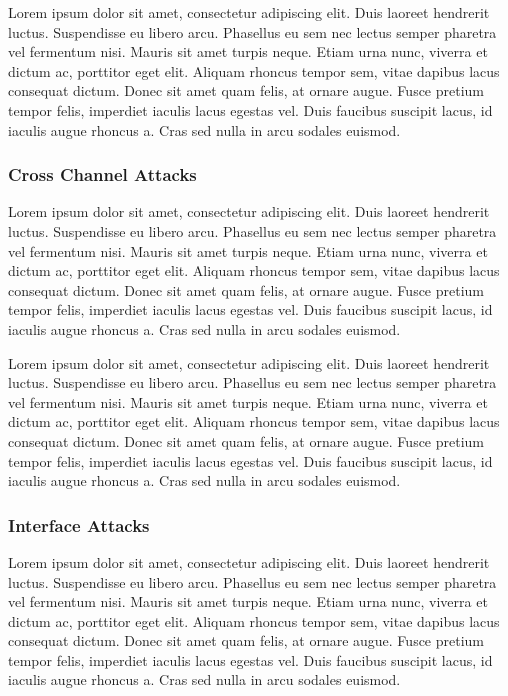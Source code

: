 \documentclass[final,conference,11pt]{IEEEtran}
\begin{document}
Lorem ipsum dolor sit amet, consectetur adipiscing elit. Duis laoreet hendrerit luctus. Suspendisse eu libero arcu. Phasellus eu sem nec lectus semper pharetra vel fermentum nisi. Mauris sit amet turpis neque. Etiam urna nunc, viverra et dictum ac, porttitor eget elit. Aliquam rhoncus tempor sem, vitae dapibus lacus consequat dictum. Donec sit amet quam felis, at ornare augue. Fusce pretium tempor felis, imperdiet iaculis lacus egestas vel. Duis faucibus suscipit lacus, id iaculis augue rhoncus a. Cras sed nulla in arcu sodales euismod.

\subsubsection{Cross Channel Attacks}
Lorem ipsum dolor sit amet, consectetur adipiscing elit. Duis laoreet hendrerit luctus. Suspendisse eu libero arcu. Phasellus eu sem nec lectus semper pharetra vel fermentum nisi. Mauris sit amet turpis neque. Etiam urna nunc, viverra et dictum ac, porttitor eget elit. Aliquam rhoncus tempor sem, vitae dapibus lacus consequat dictum. Donec sit amet quam felis, at ornare augue. Fusce pretium tempor felis, imperdiet iaculis lacus egestas vel. Duis faucibus suscipit lacus, id iaculis augue rhoncus a. Cras sed nulla in arcu sodales euismod.

Lorem ipsum dolor sit amet, consectetur adipiscing elit. Duis laoreet hendrerit luctus. Suspendisse eu libero arcu. Phasellus eu sem nec lectus semper pharetra vel fermentum nisi. Mauris sit amet turpis neque. Etiam urna nunc, viverra et dictum ac, porttitor eget elit. Aliquam rhoncus tempor sem, vitae dapibus lacus consequat dictum. Donec sit amet quam felis, at ornare augue. Fusce pretium tempor felis, imperdiet iaculis lacus egestas vel. Duis faucibus suscipit lacus, id iaculis augue rhoncus a. Cras sed nulla in arcu sodales euismod.

\subsubsection{Interface Attacks}
Lorem ipsum dolor sit amet, consectetur adipiscing elit. Duis laoreet hendrerit luctus. Suspendisse eu libero arcu. Phasellus eu sem nec lectus semper pharetra vel fermentum nisi. Mauris sit amet turpis neque. Etiam urna nunc, viverra et dictum ac, porttitor eget elit. Aliquam rhoncus tempor sem, vitae dapibus lacus consequat dictum. Donec sit amet quam felis, at ornare augue. Fusce pretium tempor felis, imperdiet iaculis lacus egestas vel. Duis faucibus suscipit lacus, id iaculis augue rhoncus a. Cras sed nulla in arcu sodales euismod.
\end{document}
